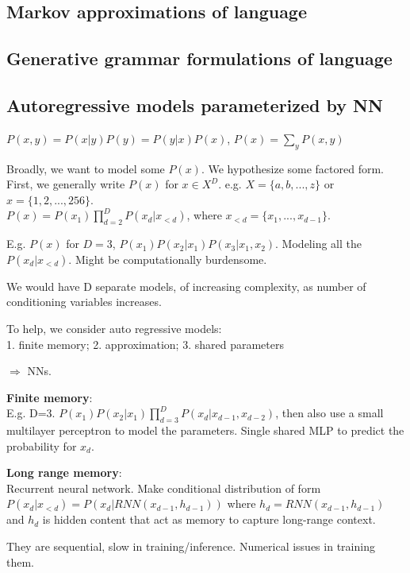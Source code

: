 \documentclass[12pt,a4paper]{article}
\begin{document}
\subsection{Markov approximations of language}

\subsection{Generative grammar formulations of language}

\newpage
\subsection{Autoregressive models parameterized by NN} 
$P(x,y)=P(x|y)P(y)=P(y|x)P(x)$, $P(x)=\sum_yP(x,y)$ 

Broadly, we want to model some $P(x)$. We hypothesize some factored form. \\
First, we generally write $P(x)$ for $x\in X^D$. e.g. $X=\{a,b,...,z\}$ or $x=\{1,2,...,256\}$.\\
$P(x)=P(x_1)\prod_{d=2}^D P(x_d|x_{<d})$, where $x_{<d}=\{x_1,...,x_{d-1}\}$. 

E.g. $P(x)$ for $D=3$, $P(x_1)P(x_2|x_1)P(x_3|x_1,x_2)$. 
Modeling all the $P(x_d|x_{<d})$. Might be computationally burdensome. 

We would have D separate models, of increasing complexity, as number of conditioning variables increases. 

To help, we consider auto regressive models:\\
1. finite memory; 2. approximation; 3. shared parameters

$\Rightarrow$ NNs.

\textbf{Finite memory}: \\
E.g. D=3. $P(x_1)P(x_2|x_1)\prod_{d=3}^D P(x_d|x_{d-1},x_{d-2})$, then also use a small multilayer perceptron to model the parameters. Single shared MLP to predict the probability for $x_d$. 


\textbf{Long range memory}: \\
Recurrent neural network. Make conditional distribution of form $P(x_d|x_{<d})=P(x_d|RNN(x_{d-1},h_{d-1}))$ where $h_d=RNN(x_{d-1},h_{d-1})$ and $h_d$ is hidden content that act as memory to capture long-range context. 

They are sequential, slow in training/inference. Numerical issues in training them. 
\end{document}
